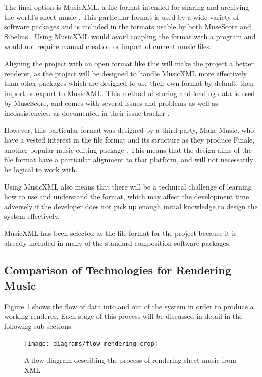 The final option is MusicXML, a file format intended for sharing and archiving the world's sheet music \parencite{mxml}. This particular format is used by a wide variety of software packages \parencite{mxml} and is included in the formats usable by both MuseScore \parencite{MuseTour} and Sibelius \parencite{avid}. Using MusicXML would avoid coupling the format with a program and would not require manual creation or import of current music files. 

Aligning the project with an open format like this will make the project a better renderer, as the project will be designed to handle MusicXML more effectively than other packages which are designed to use their own format by default, then import or export to MusicXML. This method of storing and loading data is used by MuseScore, and comes with several issues and problems as well as inconsistencies, as documented in their issue tracker \parencite{mscoreBugTracker}.

However, this particular format was designed by a third party, Make Music, who have a vested interest in the file format and its structure as they produce Finale, another popular music editing package \parencite{mxmlSoft}. This means that the design aims of the file format have a particular alignment to that platform, and will not necessarily be logical to work with.

Using MusicXML also means that there will be a technical challenge of learning how to use and understand the format, which may affect the development time adversely if the developer does not pick up enough initial knowledge to design the system effectively.

MusicXML has been selected as the file format for the project because it is already included in many of the standard composition software packages. 

\subsection{Comparison of Technologies for Rendering Music}
Figure \ref{fig:flow} shows the flow of data into and out of the system in order to produce a working renderer. Each stage of this process will be discussed in detail in the following sub sections.

\begin{figure}[H]
	\centering
	\texttt{[image: diagrams/flow-rendering-crop]}
	
	\caption{A flow diagram describing the process of rendering sheet music from XML}	
	\label{fig:flow}
\end{figure}

